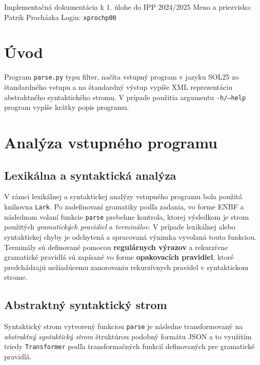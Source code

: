 \documentclass[a4paper, 11pt]{article}
\begin{document}
 {\parindent 0pt \Large
Implementačná dokumentácia k 1. úlohe do IPP 2024/2025\newline
Meno a priezvisko: Patrik Procházka\newline
Login: \texttt{xprochp00}
}

\section{Úvod}
Program \texttt{parse.py} typu filter, načíta vstupný program v jazyku \textsc{SOL25} zo štandardného vstupu a na štandardný výstup vypíše \textsc{XML} reprezentáciu abstraktného syntaktického stromu. V prípade použitia argumentu \texttt{-h/--help} program vypíše krátky popis programu.

\section{Analýza vstupného programu}

\subsection{Lexikálna a syntaktická analýza}
V rámci lexikálnej a syntaktickej analýzy vstupného programu bola použitá knihovna \texttt{Lark}. Po zadefinovaní gramatiky podľa zadania, vo forme \textsc{ENBF} a následnom volaní funkcie \texttt{parse} prebehne kontrola, ktorej výsledkom je strom použitých \emph{gramatických pravidiel} a \emph{terminálov}. V prípade lexikálnej alebo syntaktickej chyby je odchytená a spracovaná výnimka vyvolaná touto funkciou. Terminály sú definované pomocou \textbf{regulárnych výrazov} a rekurzívne gramatické pravidlá sú zapísané vo forme \textbf{opakovacích pravidiel}, ktoré predchádzajú nežiadúcemu zanorovaniu rekurzívnych pravidel v syntaktickom strome.

\subsection{Abstraktný syntaktický strom}
Syntaktický strom vytvorený funkciou \texttt{parse} je následne transformovaný na \emph{abstraktný syntaktický strom} štruktúrou podobný formátu \textsc{JSON} a to využitím triedy \texttt{Transformer} podľa transformačných funkcií definovaných pre gramatické pravidlá.
\end{document}
